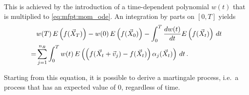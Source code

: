 This is achieved by the introduction of a time-dependent polynomial $w(t)$ that is multiplied to
\eqref{eq:mfpt:mom_ode}.
An integration by parts on $[0, T]$ yields~\cite{dowdy2018dynamic,sakurai2019bounding}
\begin{equation}\label{eq:exp_constraint}
\begin{split}
        & w(T)\,{E}\left(f(\vec X_T)\right)
        - w(0)\,{E}\left(f(\vec X_{0})\right)
        - \int_{0}^{T}\frac{dw(t)}{dt}{E}\left(f(\vec X_t)\right)\,dt\\
        =&\sum_{j=1}^{n_R}\int_{0}^{T}w(t)\,
        {E}\left(\left(f{(\vec X_t + \vec v_j)} - f(\vec X_t)\right)\alpha_j(\vec X_t)\right)\,dt\,.
        \end{split}
\end{equation}

Starting from this equation, it is possible to derive a martingale process,
i.e.\ a process that has an expected value of 0, regardless of time.


